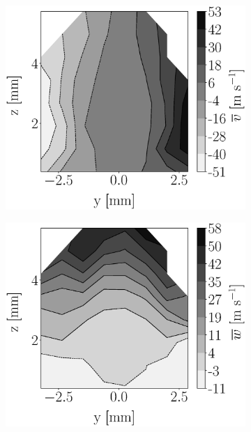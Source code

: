\begin{figure}[h!]
\begin{subfigure}[b]{0.22\textwidth}
\end{subfigure}
   \hspace{0.17in}
\begin{subfigure}[b]{0.22\textwidth}
	\centering
   \includegraphics[scale=0.17]{./part2_developments/figures_ch5_resolved_JICF/injectors_SLI/uG75_dx20_x15_uy_mean_map.eps}
\end{subfigure}
   \hspace{0.17in}
\begin{subfigure}[b]{0.22\textwidth}
	\centering
   \includegraphics[scale=0.17]{./part2_developments/figures_ch5_resolved_JICF/injectors_SLI/uG75_dx20_x15_uz_mean_map.eps}
\end{subfigure}


\end{figure}
